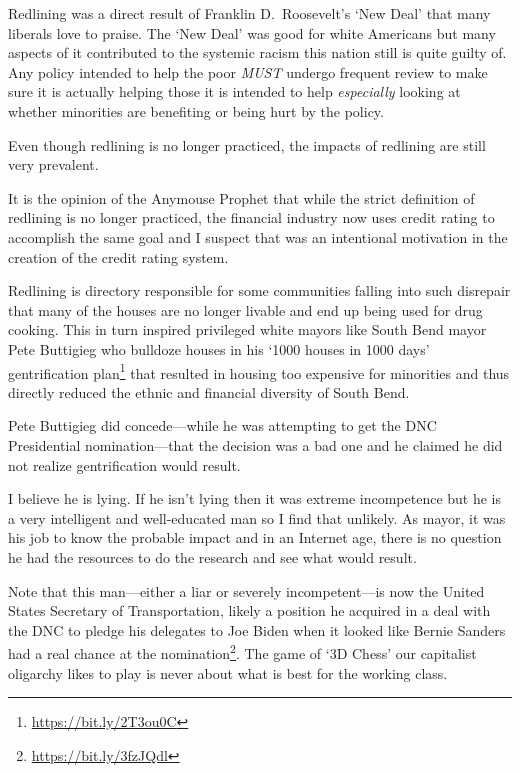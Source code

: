 Redlining was a direct result of Franklin D.\ Roosevelt's `New Deal' that many liberals love to praise. The `New Deal' was good for white Americans but many aspects of it contributed to the systemic racism this nation still is quite guilty of. Any policy intended to help the poor \emph{MUST} undergo frequent review to make sure it is actually helping those it is intended to help \emph{especially} looking at whether minorities are benefiting or being hurt by the policy.

Even though redlining is no longer practiced, the impacts of redlining are still very prevalent.

It is the opinion of the Anymouse Prophet that while the strict definition of redlining is no longer practiced, the financial industry now uses credit rating to accomplish the same goal and I suspect that was an intentional motivation in the creation of the credit rating system.

Redlining is directory responsible for some communities falling into such disrepair that many of the houses are no longer livable and end up being used for drug cooking. This in turn inspired privileged white mayors like South Bend mayor Pete Buttigieg who bulldoze houses in his `\num[group-separator={,}]{1000} houses in \num[group-separator={,}]{1000} days' gentrification plan\footnote{\url{https://bit.ly/2T3ou0C}} that resulted in housing too expensive for minorities and thus directly reduced the ethnic and financial diversity of South Bend.

Pete Buttigieg did concede---while he was attempting to get the DNC Presidential nomination---that the decision was a bad one and he claimed he did not realize gentrification would result.

I believe he is lying. If he isn't lying then it was extreme incompetence but he is a very intelligent and well-educated man so I find that unlikely. As mayor, it was his job to know the probable impact and in an Internet age, there is no question he had the resources to do the research and see what would result.

Note that this man---either a liar or severely incompetent---is now the United States Secretary of Transportation, likely a position he acquired in a deal with the DNC to pledge his delegates to Joe Biden when it looked like Bernie Sanders had a real chance at the nomination\footnote{\url{https://bit.ly/3fzJQdl}}. The game of `3D Chess' our capitalist oligarchy likes to play is never about what is best for the working class.

